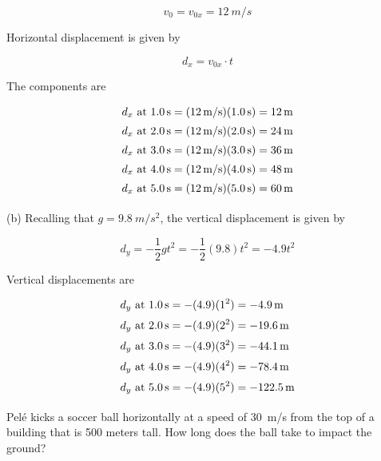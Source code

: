 \documentclass[main.tex]{subfiles}
\begin{document}
\begin{equation*}
    v_0 = v_{0x} = \SI{12}{m/s}
\end{equation*}

Horizontal displacement is given by

\begin{equation*}
    d_x = v_{0x} \cdot t
\end{equation*}

The components are

\begin{align*}
    d_x \text{ at \SI{1.0}{s}} &= (\SI{12}{m/s})(\SI{1.0}{s}) = \SI{12}{m}\\[0.5ex]
    d_x \text{ at \SI{2.0}{s}} &= (\SI{12}{m/s})(\SI{2.0}{s}) = \SI{24}{m}\\[0.5ex]
    d_x \text{ at \SI{3.0}{s}} &= (\SI{12}{m/s})(\SI{3.0}{s}) = \SI{36}{m}\\[0.5ex]
    d_x \text{ at \SI{4.0}{s}} &= (\SI{12}{m/s})(\SI{4.0}{s}) = \SI{48}{m}\\[0.5ex]
    d_x \text{ at \SI{5.0}{s}} &= (\SI{12}{m/s})(\SI{5.0}{s}) = \SI{60}{m}\\[0.5ex]
\end{align*}

(b) Recalling that $g=\SI{9.8}{m/s^2}$,  the vertical displacement is given by

\begin{equation*}
    d_y = -\frac{1}{2} g t^2 = -\frac{1}{2}(9.8) t^2 = -4.9 t^2
\end{equation*}

Vertical displacements are
\vspace{-2em}

\begin{align*}
    d_y \text{ at \SI{1.0}{s}} &= -(4.9)(1^2) = -\SI{4.9}{m}\\[0.5ex]
    d_y \text{ at \SI{2.0}{s}} &= -(4.9)(2^2) = -\SI{19.6}{m}\\[0.5ex]
    d_y \text{ at \SI{3.0}{s}} &= -(4.9)(3^2) = -\SI{44.1}{m}\\[0.5ex]
    d_y \text{ at \SI{4.0}{s}} &= -(4.9)(4^2) = -\SI{78.4}{m}\\[0.5ex]
    d_y \text{ at \SI{5.0}{s}} &= -(4.9)(5^2) = -\SI{122.5}{m}\\[0.5ex]
\end{align*}
\vspace{-1em}

\begin{example} \label{i3PZ3N}
    Pel\'{e} kicks a soccer ball horizontally at a speed of \SI{30}{m/s} from the top of a building that is 500 meters tall. How long does the ball take to impact the ground?
\end{example}
\end{document}
